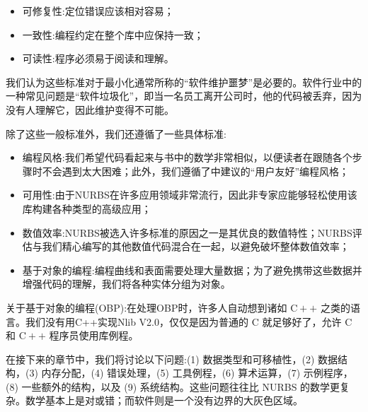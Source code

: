 \documentclass[../main.tex]{subfiles}
\begin{document}
\begin{itemize}
\item 可修复性:定位错误应该相对容易；
\end{itemize}

\begin{itemize}
\item 一致性:编程约定在整个库中应保持一致；
\end{itemize}

\begin{itemize}
\item 可读性:程序必须易于阅读和理解。
\end{itemize}

我们认为这些标准对于最小化通常所称的“软件维护噩梦”是必要的。软件行业中的一种常见问题是“软件垃圾化”，即当一名员工离开公司时，他的代码被丢弃，因为没有人理解它，因此维护变得不可能。

除了这些一般标准外，我们还遵循了一些具体标准:

\begin{itemize}
\item 编程风格:我们希望代码看起来与书中的数学非常相似，以便读者在跟随各个步骤时不会遇到太大困难；此外，我们遵循了\cite{Baly94}中建议的“用户友好”编程风格；
\end{itemize}

\begin{itemize}
\item 可用性:由于NURBS在许多应用领域非常流行，因此非专家应能够轻松使用该库构建各种类型的高级应用；
\end{itemize}

\begin{itemize}
\item 数值效率:NURBS被选入许多标准的原因之一是其优良的数值特性；NURBS评估与我们精心编写的其他数值代码混合在一起，以避免破坏整体数值效率；
\end{itemize}

\begin{itemize}
\item 基于对象的编程:编程曲线和表面需要处理大量数据；为了避免携带这些数据并增强代码的理解，我们将各种实体分组为对象。
\end{itemize}

关于基于对象的编程(OBP):在处理OBP时，许多人自动想到诸如 \(\mathrm{C} +  +\) 之类的语言。我们没有用C++实现Nlib V2.0，仅仅是因为普通的 \(\mathrm{C}\) 就足够好了，允许 \(\mathrm{C}\) 和 \(\mathrm{C} +  +\) 程序员使用库例程。

在接下来的章节中，我们将讨论以下问题:(1) 数据类型和可移植性，(2) 数据结构，(3) 内存分配，(4) 错误处理，(5) 工具例程，(6) 算术运算，(7) 示例程序，(8) 一些额外的结构，以及 (9) 系统结构。这些问题往往比 NURBS 的数学更复杂。数学基本上是对或错；而软件则是一个没有边界的大灰色区域。
\end{document}
